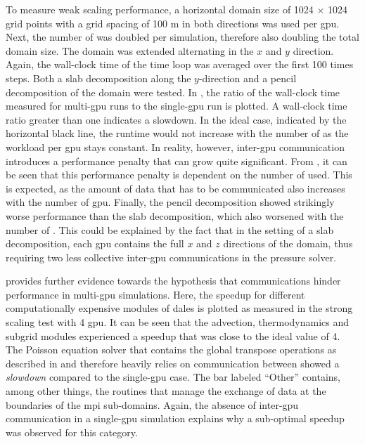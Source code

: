To measure weak scaling performance, a horizontal domain size of 1024 $\times$ 1024 grid points with a grid spacing of 100 m in both directions was used per \acrshort{gpu}. Next, the number of  was doubled per simulation, therefore also doubling the total domain size. The domain was extended alternating in the $x$ and $y$ direction. Again, the wall-clock time of the time loop was averaged over the first 100 times steps. Both a slab decomposition along the $y$-direction and a pencil decomposition of the domain were tested. In , the ratio of the wall-clock time measured for multi-\acrshort{gpu} runs to the single-\acrshort{gpu} run is plotted. A wall-clock time ratio greater than one indicates a slowdown. In the ideal case, indicated by the horizontal black line, the runtime would not increase with the number of  as the workload per \acrshort{gpu} stays constant. In reality, however, inter-\acrshort{gpu} communication introduces a performance penalty that can grow quite significant. From , it can be seen that this performance penalty is dependent on the number of  used. This is expected, as the amount of data that has to be communicated also increases with the number of \acrshort{gpu}. Finally, the pencil decomposition showed strikingly worse performance than the slab decomposition, which also worsened with the number of . This could be explained by the fact that in the setting of a slab decomposition, each \acrshort{gpu} contains the full $x$ and $z$ directions of the domain, thus requiring two less collective inter-\acrshort{gpu} communications in the pressure solver.

 provides further evidence towards the hypothesis that communications hinder performance in multi-\acrshort{gpu} simulations. Here, the speedup for different computationally expensive modules of \acrshort{dales} is plotted as measured in the strong scaling test with 4 \acrshort{gpu}. It can be seen that the advection, thermodynamics and subgrid modules experienced a speedup that was close to the ideal value of 4. The Poisson equation solver that contains the global transpose operations as described in  and therefore heavily relies on communication between  showed a \emph{slowdown} compared to the single-\acrshort{gpu} case. The bar labeled ``Other'' contains, among other things, the routines that manage the exchange of data at the boundaries of the \acrshort{mpi} sub-domains. Again, the absence of inter-\acrshort{gpu} communication in a single-\acrshort{gpu} simulation explains why a sub-optimal speedup was observed for this category.

